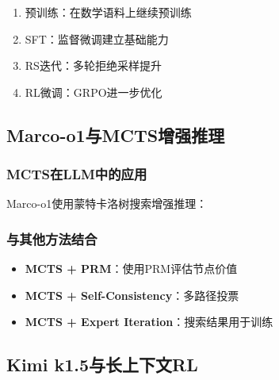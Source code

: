 \documentclass[12pt,a4paper]{article}
\newenvironment{algorithmic}[1][]%
      {\begin{list}{}{\leftmargin=2em\itemsep=0.2em\parsep=0pt\topsep=0.2em}}%
      {\end{list}}
\newcommand{\STATE}{\item[]}
\newcommand{\FOR}[1]{\item[]\textbf{for} ##1 \textbf{do}}
\newcommand{\ENDFOR}{\item[]\textbf{end for}}
\begin{document}
\begin{enumerate}
    \item 预训练：在数学语料上继续预训练
    \item SFT：监督微调建立基础能力
    \item RS迭代：多轮拒绝采样提升
    \item RL微调：GRPO进一步优化
\end{enumerate}

\subsection{Marco-o1与MCTS增强推理}

\subsubsection{MCTS在LLM中的应用}

Marco-o1使用蒙特卡洛树搜索增强推理：


\subsubsection{与其他方法结合}

\begin{itemize}
    \item \textbf{MCTS + PRM}：使用PRM评估节点价值
    \item \textbf{MCTS + Self-Consistency}：多路径投票
    \item \textbf{MCTS + Expert Iteration}：搜索结果用于训练
\end{itemize}

\subsection{Kimi k1.5与长上下文RL}
\end{document}
